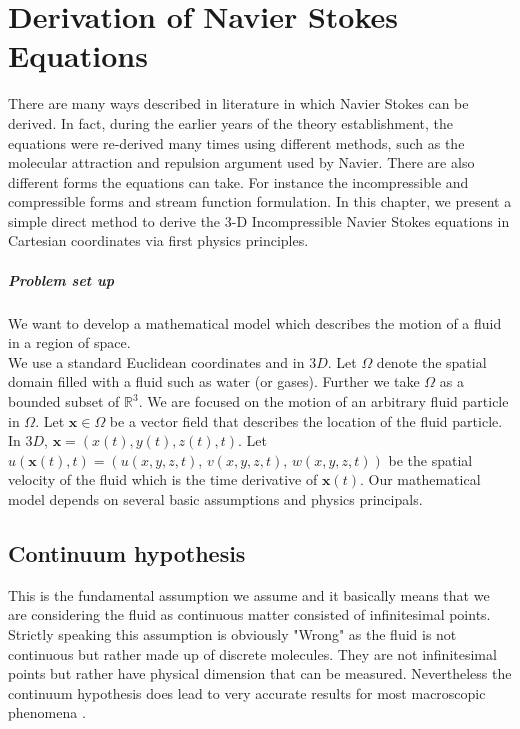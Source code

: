\chapter{Derivation of Navier Stokes Equations}
\label{chapter2}
There are many ways described in literature in which Navier Stokes can be derived. In fact, during the earlier years of the theory establishment, the equations were re-derived many times using different methods, such as the molecular attraction and repulsion argument used by Navier. There are also different forms the equations can take. For instance the incompressible and compressible forms and stream function formulation. In this chapter, we present a simple direct method to derive the 3-D Incompressible Navier Stokes equations in Cartesian coordinates via first physics principles.\\

\paragraph*{Problem set up}
We want to develop a mathematical model which describes the motion of a fluid in a region of space. \\
We use a standard Euclidean coordinates and in $3D$. Let $\Omega$ denote the spatial domain filled with a fluid such as water (or gases). Further we take $\Omega$ as a bounded subset of $\mathbb{R}^3$. We are focused on the motion of an arbitrary fluid particle in $\Omega$. Let $\textbf{x} \in \Omega$ be a vector field that describes the location of the fluid particle. In $3D$, $\textbf{x} = (x(t), y(t), z(t), t)$. Let $u(\textbf{x}(t), t) = \left( u(x,y,z,t),\,v(x,y,z,t),\,w(x,y,z,t)\right)$ be the spatial velocity of the fluid which is the time derivative of $\textbf{x}(t)$. Our mathematical model depends on several basic assumptions and physics principals.\\

\section{Continuum hypothesis}
This is the fundamental assumption we assume and it basically means that we are considering the fluid as continuous matter consisted of infinitesimal points. Strictly speaking this assumption is obviously "Wrong" as the fluid is not continuous but rather made up of discrete molecules. They are not infinitesimal points but rather have physical dimension that can be measured. Nevertheless the continuum hypothesis does lead to very accurate results for most macroscopic phenomena \cite{chorin1990mathematical}.\\

